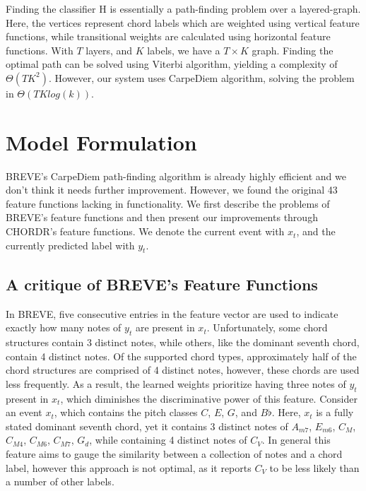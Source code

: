 \documentclass{article} %
\begin{document}
Finding the classifier H is essentially a path-finding problem over a layered-graph. Here, the vertices represent chord labels which are weighted using vertical feature functions, while transitional weights are calculated using horizontal feature functions. With $T$ layers, and $K$ labels, we have a $T \times K$ graph. Finding the optimal path can be solved using Viterbi algorithm, yielding a complexity of $\Theta(TK^2)$. However, our system uses CarpeDiem algorithm, solving the problem in $\Theta(TKlog(k))$.

\section{Model Formulation}

BREVE’s CarpeDiem path-finding algorithm \cite{carpediem} is already highly efficient and we don’t think it needs further improvement. However, we found the original 43 feature functions lacking in functionality. We first describe the problems of BREVE’s feature functions and then present our improvements through CHORDR’s feature functions. We denote the current event with $x_t$, and the currently predicted label with $y_t$.

\subsection{A critique of BREVE's Feature Functions}

In BREVE, five consecutive entries in the feature vector are used to indicate exactly how many notes of $y_t$ are present in $x_t$. Unfortunately, some chord structures contain 3 distinct notes, while others, like the dominant seventh chord, contain 4 distinct notes. Of the supported chord types, approximately half of the chord structures are comprised of 4 distinct notes, however, these chords are used less frequently. As a result, the learned weights prioritize having three notes of $y_t$ present in $x_t$, which diminishes the discriminative power of this feature. Consider an event $x_t$, which contains the pitch classes $C$, $E$, $G$, and $B\flat$. Here, $x_t$ is a fully stated dominant seventh chord, yet it contains 3 distinct notes of $A_{m7}$, $E_{m6}$, $C_{M}$, $C_{M4}$, $C_{M6}$, $C_{M7}$, $G_{d}$, while containing 4 distinct notes of $C_V$. In general this feature aims to gauge the similarity between a collection of notes and a chord label, however this approach is not optimal, as it reports $C_V$ to be less likely than a number of other labels.
\end{document}
